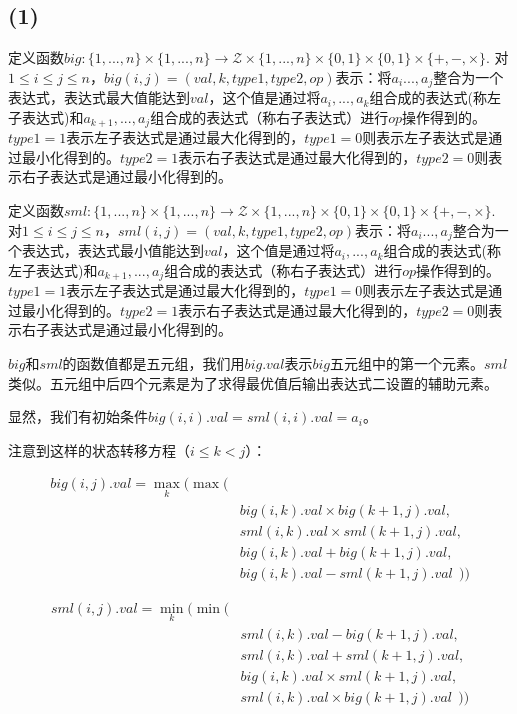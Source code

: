 \documentclass{ctexart}
\begin{document}
\subsection*{(1)}

定义函数$big : \{1,...,n\} \times \{1,...,n\} \rightarrow \mathcal{Z} \times \{1,...,n\} \times \{0,1\} \times \{0,1\} \times \{+,-,\times \} $. 对$1\le i \le j \le n$，$big(i,j) = (val,k,type1,type2,op)$表示：将$a_i...,a_j$整合为一个表达式，表达式最大值能达到$val$，这个值是通过将$a_i,...,a_k$组合成的表达式(称左子表达式)和$a_{k+1},...,a_j$组合成的表达式（称右子表达式）进行$op$操作得到的。$type1=1$表示左子表达式是通过最大化得到的，$type1=0$则表示左子表达式是通过最小化得到的。$type2=1$表示右子表达式是通过最大化得到的，$type2=0$则表示右子表达式是通过最小化得到的。

定义函数$sml : \{1,...,n\} \times \{1,...,n\} \rightarrow \mathcal{Z} \times \{1,...,n\} \times \{0,1\} \times \{0,1\} \times \{+,-,\times \} $. 对$1\le i \le j \le n$，$sml(i,j) = (val,k,type1,type2,op)$表示：将$a_i...,a_j$整合为一个表达式，表达式最小值能达到$val$，这个值是通过将$a_i,...,a_k$组合成的表达式(称左子表达式)和$a_{k+1},...,a_j$组合成的表达式（称右子表达式）进行$op$操作得到的。$type1=1$表示左子表达式是通过最大化得到的，$type1=0$则表示左子表达式是通过最小化得到的。$type2=1$表示右子表达式是通过最大化得到的，$type2=0$则表示右子表达式是通过最小化得到的。

$big$和$sml$的函数值都是五元组，我们用$big.val$表示$big$五元组中的第一个元素。$sml$类似。五元组中后四个元素是为了求得最优值后输出表达式二设置的辅助元素。

显然，我们有初始条件$big(i,i).val=sml(i,i).val=a_i$。

注意到这样的状态转移方程（$i\le k < j$）：

$$
\begin{aligned}
big(i,j).val = \max _k ( \max ( & \\
  & big(i,k).val \times big(k+1,j).val,\\
  & sml(i,k).val \times sml(k+1,j).val,\\
  & big(i,k).val + big(k+1,j).val,\\
  & big(i,k).val - sml(k+1,j).val\ \  )  )
\end{aligned}
$$

$$
\begin{aligned}
sml(i,j).val = \min _k ( \min ( & \\
  & sml(i,k).val - big(k+1,j).val,\\
  & sml(i,k).val + sml(k+1,j).val,\\
  & big(i,k).val \times sml(k+1,j).val,\\
  & sml(i,k).val \times big(k+1,j).val\ \  )  )
\end{aligned}
$$
\end{document}
